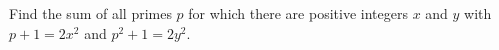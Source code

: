 Find the sum of all primes $p$ for which there are positive integers $x$ and $y$ with $p+1=2x^2$ and $p^2+1=2y^2$.
